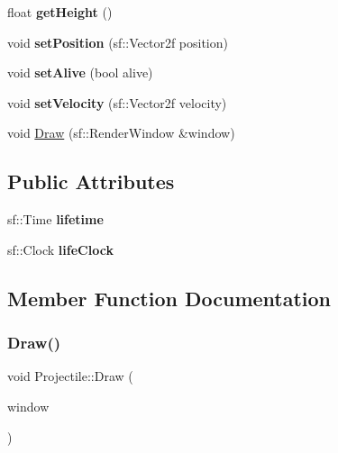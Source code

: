 \begin{DoxyCompactItemize}
float {\bfseries get\+Height} ()
\item 
\mbox{\label{class_projectile_ae07f879ff7091e007f89e1e875f08962}} 
void {\bfseries set\+Position} (sf\+::\+Vector2f position)
\item 
\mbox{\label{class_projectile_a7125bb834b93eb0dbe6484c015949e80}} 
void {\bfseries set\+Alive} (bool alive)
\item 
\mbox{\label{class_projectile_a98891d8de7607df133f975ec8e249ccf}} 
void {\bfseries set\+Velocity} (sf\+::\+Vector2f velocity)
\item 
void \mbox{\hyperlink{class_projectile_a0c13be2f57f656bae015fa3ecfffa572}{Draw}} (sf\+::\+Render\+Window \&window)
\end{DoxyCompactItemize}
\subsection*{Public Attributes}
\begin{DoxyCompactItemize}
\item 
\mbox{\label{class_projectile_ada05bf23fbcb757cd7121dec3d0a72bd}} 
sf\+::\+Time {\bfseries lifetime}
\item 
\mbox{\label{class_projectile_a2a4fb9a99683ea017ca05a8a0d8a670c}} 
sf\+::\+Clock {\bfseries life\+Clock}
\end{DoxyCompactItemize}


\subsection{Member Function Documentation}
\mbox{\label{class_projectile_a0c13be2f57f656bae015fa3ecfffa572}} 
\subsubsection{\texorpdfstring{Draw()}{Draw()}}
{\footnotesize\ttfamily void Projectile\+::\+Draw (\begin{DoxyParamCaption}\item[{sf\+::\+Render\+Window \&}]{window }\end{DoxyParamCaption})}

